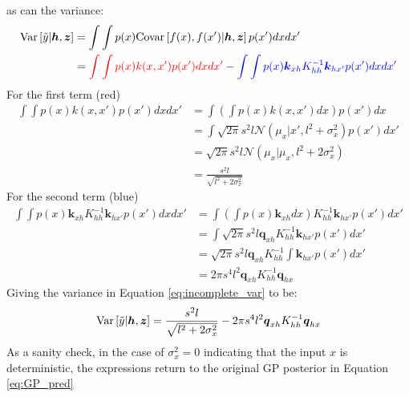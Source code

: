 \documentclass{article}
\begin{document}
as can the variance:
\begin{equation}
    \begin{aligned}
        \text{Var}\left[\Tilde{y}|\boldsymbol{h},\boldsymbol{z}\right]&=\int\int p(x)\text{Covar}\left[f(x),f(x')|\boldsymbol{h},\boldsymbol{z}\right]p(x')dxdx' \\
        &=\textcolor{red}{\int\int p(x)k(x,x')p(x')dxdx'}
        -\textcolor{blue}{\int\int p(x)\boldsymbol{k}_{xh}K_{hh}^{-1}\boldsymbol{k}_{hx'}p(x')dxdx'}
    \label{eq:incomplete_var}
    \end{aligned}
\end{equation}
For the first term (red)
\begin{equation}
    \begin{aligned}
        \int\int p(x)k(x,x')p(x')dxdx'&=\int\left(\int p(x)k(x,x')dx\right)p(x')dx \\
        &=\int \sqrt{2\pi}s^2l\mathcal{N}(\mu_x|x',l^2 + \sigma_x^2)p(x')dx' \\
        &=\sqrt{2\pi}s^2l\mathcal{N}(\mu_x|\mu_x,l^2+2\sigma_x^2) \\
        &=\frac{s^2l}{\sqrt{l^2+2\sigma_x^2}}
    \end{aligned}
\end{equation}
For the second term (blue)
\begin{equation}
    \begin{aligned}
        \int\int p(x)\boldsymbol{k}_{xh}K_{hh}^{-1}\boldsymbol{k}_{hx'}p(x')dxdx'
        &=\int\left(\int p(x)\boldsymbol{k}_{xh}dx\right)K_{hh}^{-1}\boldsymbol{k}_{hx'}p(x')dx' \\
        &=\int \sqrt{2\pi}s^2l\boldsymbol{q}_{xh}K_{hh}^{-1}\boldsymbol{k}_{hx'}p(x')dx' \\
        &=\sqrt{2\pi}s^2l\boldsymbol{q}_{xh}K_{hh}^{-1} \int \boldsymbol{k}_{hx'}p(x')dx' \\
        &=2\pi s^4 l^2 \boldsymbol{q}_{xh}K_{hh}^{-1}\boldsymbol{q}_{hx}
    \end{aligned}
\end{equation}
Giving the variance in Equation \ref{eq:incomplete_var} to be:
\begin{equation}
    \text{Var}\left[\Tilde{y}|\boldsymbol{h},\boldsymbol{z}\right]=\frac{s^2l}{\sqrt{l^2+2\sigma_x^2}} - 2\pi s^4 l^2 \boldsymbol{q}_{xh}K_{hh}^{-1}\boldsymbol{q}_{hx}
\end{equation}
As a sanity check, in the case of $\sigma_x^2=0$ indicating that the input $x$ is deterministic, the expressions return to the original GP posterior in Equation \ref{eq:GP_pred}
\end{document}
